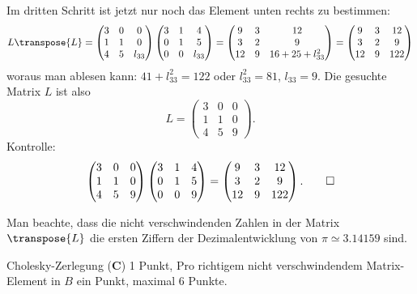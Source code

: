 \begin{loesung}
Im dritten Schritt ist jetzt nur noch das Element unten rechts zu bestimmen:
\[
L\transpose{L}=
\begin{pmatrix}
3&0&     0\\
1&1&     0\\
4&5&l_{33}
\end{pmatrix}
\begin{pmatrix}
3&1&     4\\
0&1&     5\\
0&0&l_{33}
\end{pmatrix}
=
\begin{pmatrix}
 9& 3& 12\\
 3& 2&  9\\
12& 9&16+25+l_{33}^2
\end{pmatrix}
=
\begin{pmatrix}
 9& 3& 12\\
 3& 2&  9\\
12& 9&122
\end{pmatrix}
\]
woraus man ablesen kann: $41+l_{33}^2=122$ oder $l_{33}^2=81$, $l_{33}=9$.
Die gesuchte Matrix $L$ ist also
\[
L=
\begin{pmatrix}
3&0&0\\
1&1&0\\
4&5&9
\end{pmatrix}.
\]
Kontrolle:
\[
\begin{pmatrix}
3&0&0\\
1&1&0\\
4&5&9
\end{pmatrix}
\begin{pmatrix}
3&1&4\\
0&1&5\\
0&0&9
\end{pmatrix}
=
\begin{pmatrix}
 9& 3& 12\\
 3& 2&  9\\
12& 9&122
\end{pmatrix}.
\qedhere
\]
\end{loesung}

\begin{diskussion}
Man beachte, dass die nicht verschwindenden Zahlen in der Matrix $\transpose{L}$
die ersten Ziffern der Dezimalentwicklung von $\pi\simeq3.14159$ sind.
\end{diskussion}

\begin{bewertung}
Cholesky-Zerlegung ({\bf C}) 1 Punkt,
Pro richtigem nicht verschwindendem Matrix-Element in $B$ ein Punkt,
maximal 6 Punkte.
\end{bewertung}

